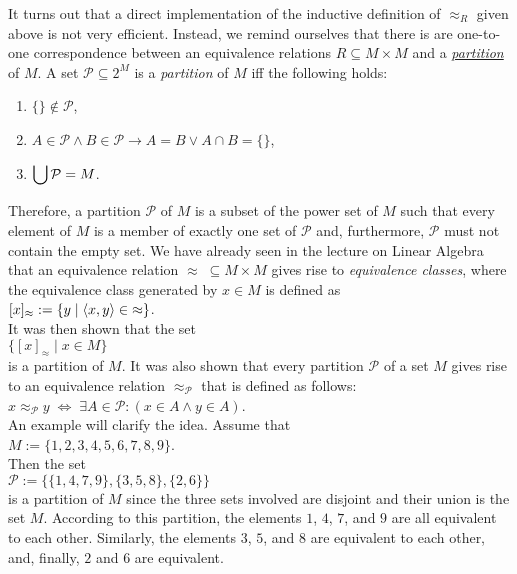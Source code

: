 It turns out that a direct implementation of the inductive definition of $\approx_R$ given above is
not very efficient.  Instead, we remind ourselves that there is are one-to-one correspondence
between an equivalence relations $R \subseteq M \times M$ and a
\href{https://en.wikipedia.org/wiki/Partition_of_a_set}{\emph{partition}} of $M$.  A set 
$\mathcal{P} \subseteq 2^M$ is a \emph{partition} of $M$ iff the following holds:
\begin{enumerate}
\item $\{\} \not\in \mathcal{P}$,
\item $A \in \mathcal{P} \wedge B \in \mathcal{P} \rightarrow A = B \vee A \cap B = \{\}$,
\item $\displaystyle\bigcup \mathcal{P} = M$.
\end{enumerate}
Therefore, a partition $\mathcal{P}$ of $M$ is a subset of the power set of $M$ such that
every element of $M$ is a member of exactly one set of $\mathcal{P}$ and, furthermore, $\mathcal{P}$ must not contain the
empty set.  We have already seen in the lecture on Linear Algebra that an equivalence relation 
$\approx \;\subseteq M \times M$ gives rise to \emph{equivalence classes}, where the equivalence class
generated by $x \in M$ is defined as
\\[0.2cm]
\hspace*{1.3cm}
$[x]_\approx := \{ y \mid \pair(x, y) \in\; \approx \}$.
\\[0.2cm]
It was then shown that the set 
\\[0.2cm]
\hspace*{1.3cm}
$\bigl\{ [x]_\approx \;\big|\; x \in M \bigr\}$
\\[0.2cm]
is a partition of $M$.  It was also shown that every partition $\mathcal{P}$ of a set $M$ gives rise
to an equivalence relation $\approx_\mathcal{P}$ that is defined as follows:
\\[0.2cm]
\hspace*{1.3cm}
$x \approx_\mathcal{P} y \;\Longleftrightarrow\; \exists A \in \mathcal{P}:(x \in A \wedge y \in A)$.
\\[0.2cm]
An example will clarify the idea.  Assume that
\\[0.2cm]
\hspace*{1.3cm}
$M := \{ 1,2,3,4,5,6,7,8,9 \}$.
\\[0.2cm]
Then the set 
\\[0.2cm]
\hspace*{1.3cm}
$\mathcal{P} := \bigl\{ \{ 1, 4, 7, 9\}, \{3, 5, 8\}, \{2, 6\} \bigr\}$
\\[0.2cm]
is a partition of $M$ since the three sets involved are disjoint and their union is the set $M$.
According to this partition, the elements $1$, $4$, $7$, and $9$ are all
equivalent to each other.  Similarly, the elements $3$, $5$, and $8$ are equivalent to each other,
and, finally, $2$ and $6$ are equivalent.

